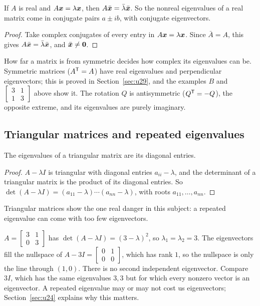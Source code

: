 \begin{proposition}\label{prop:u23-conj}
If $A$ is real and $A\boldsymbol{x}=\lambda\boldsymbol{x}$, then $A\bar{\boldsymbol{x}}=\bar\lambda\bar{\boldsymbol{x}}$.
So the nonreal eigenvalues of a real matrix come in conjugate pairs $a\pm ib$, with conjugate
eigenvectors.
\end{proposition}

\begin{proof}
Take complex conjugates of every entry in $A\boldsymbol{x}=\lambda\boldsymbol{x}$. Since $\bar A=A$, this
gives $A\bar{\boldsymbol{x}}=\bar\lambda\bar{\boldsymbol{x}}$, and $\bar{\boldsymbol{x}}\neq\boldsymbol{0}$.
\end{proof}

How far a matrix is from symmetric decides how complex its eigenvalues can be. Symmetric
matrices ($A^{\mathsf{T}}=A$) have real eigenvalues and perpendicular eigenvectors; this is proved in
Section~\ref{sec:u29}, and the examples $B$ and $\left[\begin{smallmatrix} 3&1\\ 1&3\end{smallmatrix}\right]$
above show it. The rotation $Q$ is antisymmetric ($Q^{\mathsf{T}}=-Q$), the opposite extreme, and its
eigenvalues are purely imaginary.

\subsection{Triangular matrices and repeated eigenvalues}

\begin{proposition}\label{prop:u23-triangular}
The eigenvalues of a triangular matrix are its diagonal entries.
\end{proposition}

\begin{proof}
$A-\lambda I$ is triangular with diagonal entries $a_{ii}-\lambda$, and the determinant of a
triangular matrix is the product of its diagonal entries. So
$\det(A-\lambda I)=(a_{11}-\lambda)\cdots(a_{nn}-\lambda)$, with roots $a_{11},\dots,a_{nn}$.
\end{proof}

Triangular matrices show the one real danger in this subject: a repeated eigenvalue can come
with too few eigenvectors.

\begin{example}\label{ex:u23-defective}
$A=\begin{bmatrix} 3&1\\ 0&3\end{bmatrix}$ has $\det(A-\lambda I)=(3-\lambda)^{2}$, so
$\lambda_1=\lambda_2=3$. The eigenvectors fill the nullspace of
$A-3I=\left[\begin{smallmatrix} 0&1\\ 0&0\end{smallmatrix}\right]$, which has rank $1$, so
the nullspace is only the line through $(1,0)$. There is no second independent eigenvector.
Compare $3I$, which has the same eigenvalues $3,3$ but for which every nonzero vector is an
eigenvector. A repeated eigenvalue may or may not cost us eigenvectors; Section~\ref{sec:u24}
explains why this matters.
\end{example}

